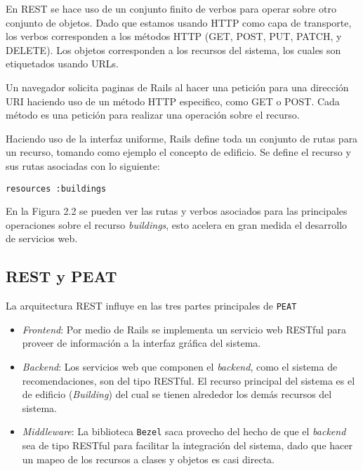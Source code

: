 En REST se hace uso de un conjunto finito de verbos para operar sobre otro
conjunto de objetos. Dado que estamos usando HTTP como capa de transporte, los
verbos corresponden a los métodos HTTP (GET, POST, PUT, PATCH, y DELETE).
Los objetos corresponden a los recursos del sistema, los cuales son etiquetados
usando URLs.

Un navegador solicita paginas de Rails al hacer una petición para una dirección URI
haciendo uso de un método HTTP especifico, como GET o POST. Cada método es una
petición para realizar una operación sobre el recurso.

Haciendo uso de la interfaz uniforme, Rails define toda un conjunto de rutas
para un recurso, tomando como ejemplo el concepto de edificio. Se define
el recurso y sus rutas asociadas con lo siguiente:

\begin{verbatim}
resources :buildings
\end{verbatim}

En la Figura 2.2 se pueden ver las rutas y verbos asociados para las principales
operaciones sobre el recurso \textit{buildings}, esto acelera en gran medida
el desarrollo de servicios web.


\subsection{REST y PEAT}
La arquitectura REST influye en las tres partes principales de \texttt{PEAT}

\begin{itemize}
\item \textit{Frontend}: Por medio de Rails se implementa un servicio web RESTful
  para proveer de información a la interfaz gráfica del sistema.
\item \textit{Backend}: Los servicios web que componen el \textit{backend}, como el
  sistema de recomendaciones, son del tipo RESTful. El recurso principal del sistema
  es el de edificio (\textit{Building}) del cual se tienen alrededor los demás
  recursos del sistema.
\item \textit{Middleware}: La biblioteca \texttt{Bezel} saca provecho del hecho
  de que el \textit{backend} sea de tipo RESTful para facilitar la integración del
  sistema, dado que hacer un mapeo de los recursos a clases y objetos es
  casi directa.

\end{itemize}
